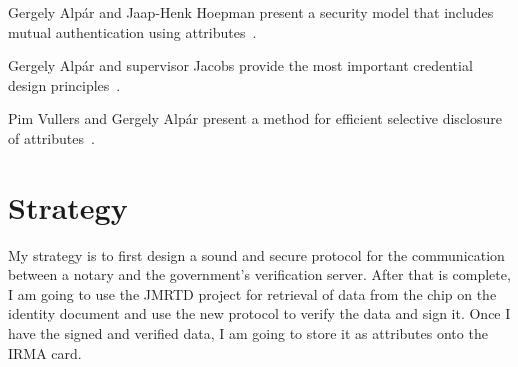 \documentclass[a4paper, oneside]{scrartcl}
\begin{document}
Gergely Alp\'ar and Jaap-Henk Hoepman present a security model that includes mutual authentication using attributes~\cite{gergely2013secure}.

Gergely Alp\'ar and supervisor Jacobs provide the most important credential design principles~\cite{gergely2013credential}.

Pim Vullers and Gergely Alp\'ar present a method for efficient selective disclosure of attributes~\cite{vullers2013efficient}.

\section{Strategy}


My strategy is to first design a sound and secure protocol for the communication between a notary and the government's verification server. After that is complete, I am going to use the JMRTD project for retrieval of data from the chip on the identity document and use the new protocol to verify the data and sign it. Once I have the signed and verified data, I am going to store it as attributes onto the IRMA card.
\end{document}
